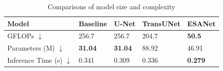\begin{table}[!t]
\caption{Comparisons of model size and complexity}
\label{tab:model_complexity}
\centering
\begin{tabular}{l|llll}
\hline
Model       & Baseline  & U-Net & TransUNet & ESANet \\
\hline
GFLOPs $\downarrow$     & 256.7     & 256.7 & 204.7    & \textbf{50.5}\\
\hline
Parameters (M) $\downarrow$ & \textbf{31.04}     & \textbf{31.04} & 88.92     & 46.91\\
\hline
Inference Time (s) $\downarrow$& 0.341   & 0.309 & 0.336  & \textbf{0.279}
\\\hline
\end{tabular}
\vspace{0.4pt} %
\end{table} 


